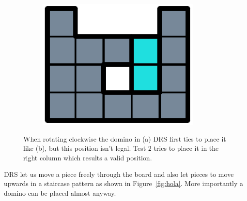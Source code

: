 \begin{figure}[ht]
\begin{subfigure}[b]{0.2\textwidth}
    \caption{}
  \end{subfigure}
  \begin{subfigure}[b]{0.2\textwidth}
    \centering
    \includegraphics[width=0.9\textwidth]{pictures/dominoes/drs-3.pdf}
    \caption{}
  \end{subfigure}
  \caption{When rotating clockwise the domino in (a) DRS first ties to place it like (b), but this position isn't legal. Test 2 tries to place it in the right column which results a valid position.}
  \label{dom:drs}
\end{figure}

DRS let us move a piece freely through the board and also let pieces to move upwards in a staircase pattern as shown in Figure~\ref{fig:hola}. More importantly a domino can be placed almost anyway.

